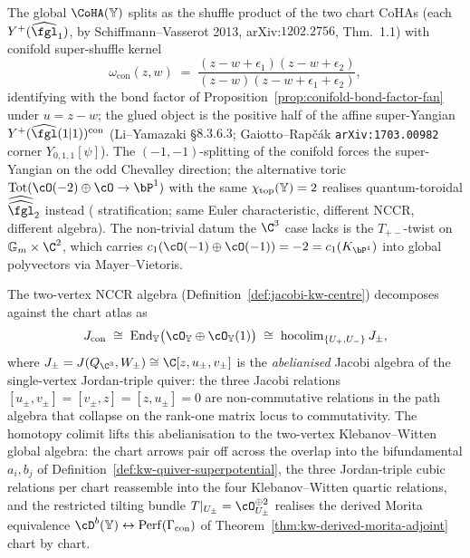 \begin{remark}
\label{rem:conifold-chart-hall-factorisation}
The global $\CoHA(\bY)$ splits as the shuffle product of the two chart CoHAs (each $Y^+(\widehat{\fgl}_1)$, by Schiffmann--Vasserot 2013, arXiv:$1202.2756$, Thm.~1.1) with conifold super-shuffle kernel
\[
 \omega_{\mathrm{con}}(z, w) \;=\; \frac{(z - w + \epsilon_1)(z - w + \epsilon_2)}{(z - w)(z - w + \epsilon_1 + \epsilon_2)},
\]
identifying with the bond factor of Proposition~\ref{prop:conifold-bond-factor-fan} under $u = z - w$; the glued object is the positive half of the affine super-Yangian $Y^+(\widehat{\fgl}(1|1))^{\mathrm{con}}$ (Li--Yamazaki \S$8.3.6.3$; Gaiotto--Rap\v{c}\'ak \texttt{arXiv:1703.00982} corner $Y_{0,1,1}[\psi]$). The $(-1, -1)$-splitting of the conifold forces the super-Yangian on the odd Chevalley direction; the alternative toric $\mathrm{Tot}(\cO(-2) \oplus \cO \to \bP^1)$ with the same $\chi_{\mathrm{top}}(\mathbb{Y}) = 2$ realises quantum-toroidal $\widehat{\widehat{\fgl}}_2$ instead ( stratification; same Euler characteristic, different NCCR, different algebra). The non-trivial datum the $\C^3$ case lacks is the $T_{+-}$-twist on $\Gm \times \C^2$, which carries $c_1(\cO(-1) \oplus \cO(-1)) = -2 = c_1(K_{\bP^1})$ into global polyvectors via Mayer--Vietoris.
\end{remark}

\begin{remark}
\label{rem:szendroi-cech-reconciliation}
The two-vertex NCCR algebra (Definition~\ref{def:jacobi-kw-centre}) decomposes against the chart atlas as
\[
 J_{\mathrm{con}} \;\cong\; \mathrm{End}_{\bY}\bigl(\cO_{\bY} \oplus \cO_{\bY}(1)\bigr) \;\cong\; \mathrm{hocolim}_{\{U_+, U_-\}}\, J_\pm,
\]
where $J_\pm = J(Q_{\C^3}, W_\pm) \cong \C[z, u_\pm, v_\pm]$ is the \emph{abelianised} Jacobi algebra of the single-vertex Jordan-triple quiver: the three Jacobi relations $[u_\pm, v_\pm] = [v_\pm, z] = [z, u_\pm] = 0$ are non-commutative relations in the path algebra that collapse on the rank-one matrix locus to commutativity. The homotopy colimit lifts this abelianisation to the two-vertex Klebanov--Witten global algebra: the chart arrows pair off across the overlap into the bifundamental $a_i, b_j$ of Definition~\ref{def:kw-quiver-superpotential}, the three Jordan-triple cubic relations per chart reassemble into the four Klebanov--Witten quartic relations, and the restricted tilting bundle $T|_{U_\pm} = \cO_{U_\pm}^{\oplus 2}$ realises the derived Morita equivalence $\cD^b(\bY) \leftrightarrow \mathrm{Perf}(\Gamma_{\mathrm{con}})$ of Theorem~\ref{thm:kw-derived-morita-adjoint} chart by chart.
\end{remark}

